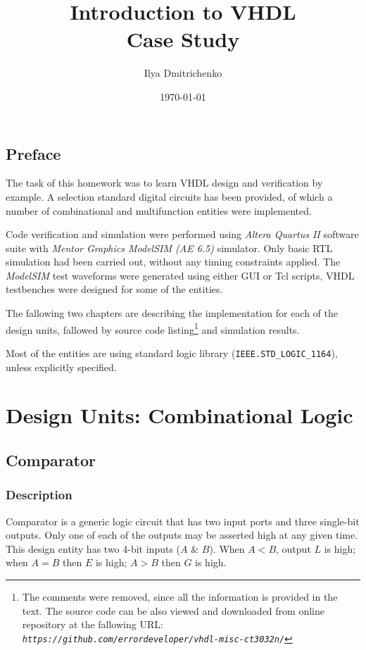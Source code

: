 \documentclass[10pt,a4paper]{report}
\author{Ilya Dmitrichenko}
\title{Introduction to VHDL \\ Case Study}
\date{\today}
\begin{document}
\maketitle

\section*{Preface}

 The task of this homework was to learn
 VHDL design and verification by example.
 A selection standard digital circuits
 has been provided, of which a number
 of combinational and multifunction
 entities were implemented.

 Code verification and simulation were
 performed using \emph{Altera Quartus II}
 software suite with \emph{Mentor Graphics
 ModelSIM (AE 6.5)} simulator.
 Only basic RTL simulation had been
 carried out, without any timing constraints
 applied. The \emph{ModelSIM} test waveforms
 were generated using either GUI or Tcl scripts,
 VHDL testbenches were designed for some of
 the entities.

 The fallowing two chapters are describing
 the implementation for each of the design
 units, fallowed by source code listing\footnote{
 The comments were removed, since all the
 information is provided in the text. The
 source code can be also viewed and downloaded
 from online repository at the fallowing URL: \\
 \emph{\texttt{https://github.com/errordeveloper/vhdl-misc-ct3032n/}}}
 and simulation results.

 Most of the entities are using standard
 logic library (\texttt{IEEE.STD\_LOGIC\_1164}),
 unless explicitly specified.

\tableofcontents
\listoffigures

\chapter{Design Units: Combinational Logic}

\section{Comparator}

\subsection{Description}

 Comparator is a generic logic circuit that
 has two input ports and three single-bit
 outputs. Only one of each of the outputs
 may be asserted high at any given time.
 This design entity has two 4-bit inputs
 ($A$ \& $B$). When $A < B$, output $L$
 is high; when $A = B$ then $E$ is high;
 $A > B$ then $G$ is high.
\end{document}
